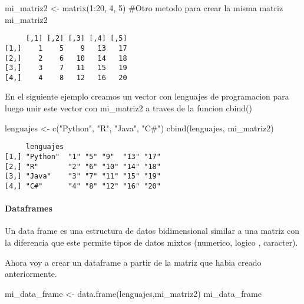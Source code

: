 \documentclass[
  letterpaper,
  DIV=11,
  numbers=noendperiod]{scrartcl}
\let\oldparagraph\paragraph
\renewcommand{\paragraph}[1]{\oldparagraph{#1}\mbox{}}
\newenvironment{Shaded}{\begin{snugshade}}{\end{snugshade}}
\newcommand{\CommentTok}[1]{\textcolor[rgb]{0.37,0.37,0.37}{#1}}
\newcommand{\DecValTok}[1]{\textcolor[rgb]{0.68,0.00,0.00}{#1}}
\newcommand{\FunctionTok}[1]{\textcolor[rgb]{0.28,0.35,0.67}{#1}}
\newcommand{\NormalTok}[1]{\textcolor[rgb]{0.00,0.23,0.31}{#1}}
\newcommand{\OtherTok}[1]{\textcolor[rgb]{0.00,0.23,0.31}{#1}}
\newcommand{\SpecialCharTok}[1]{\textcolor[rgb]{0.37,0.37,0.37}{#1}}
\newcommand{\StringTok}[1]{\textcolor[rgb]{0.13,0.47,0.30}{#1}}
\begin{document}
\begin{Shaded}
\begin{Highlighting}[]
\NormalTok{mi\_matriz2 }\OtherTok{\textless{}{-}} \FunctionTok{matrix}\NormalTok{(}\DecValTok{1}\SpecialCharTok{:}\DecValTok{20}\NormalTok{, }\DecValTok{4}\NormalTok{, }\DecValTok{5}\NormalTok{) }\CommentTok{\#Otro metodo para crear la misma matriz}
\NormalTok{mi\_matriz2}
\end{Highlighting}
\end{Shaded}

\begin{verbatim}
     [,1] [,2] [,3] [,4] [,5]
[1,]    1    5    9   13   17
[2,]    2    6   10   14   18
[3,]    3    7   11   15   19
[4,]    4    8   12   16   20
\end{verbatim}

En el siguiente ejemplo creamos un vector con lenguajes de programacion
para luego unir este vector con mi\_matriz2 a traves de la funcion
cbind()

\begin{Shaded}
\begin{Highlighting}[]
\NormalTok{lenguajes }\OtherTok{\textless{}{-}} \FunctionTok{c}\NormalTok{(}\StringTok{"Python"}\NormalTok{, }\StringTok{"R"}\NormalTok{, }\StringTok{"Java"}\NormalTok{, }\StringTok{"C\#"}\NormalTok{)}
\FunctionTok{cbind}\NormalTok{(lenguajes, mi\_matriz2)}
\end{Highlighting}
\end{Shaded}

\begin{verbatim}
     lenguajes                       
[1,] "Python"  "1" "5" "9"  "13" "17"
[2,] "R"       "2" "6" "10" "14" "18"
[3,] "Java"    "3" "7" "11" "15" "19"
[4,] "C#"      "4" "8" "12" "16" "20"
\end{verbatim}

\paragraph{Dataframes}\label{dataframes}

Un data frame es una estructura de datos bidimensional similar a una
matriz con la diferencia que este permite tipos de datos mixtos
(numerico, logico , caracter).

Ahora voy a crear un dataframe a partir de la matriz que habia creado
anteriormente.

\begin{Shaded}
\begin{Highlighting}[]
\NormalTok{mi\_data\_frame }\OtherTok{\textless{}{-}} \FunctionTok{data.frame}\NormalTok{(lenguajes,mi\_matriz2)}
\NormalTok{mi\_data\_frame}
\end{Highlighting}
\end{Shaded}
\end{document}
